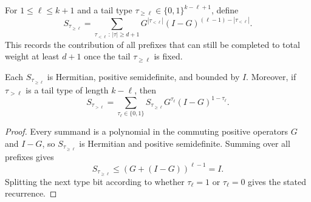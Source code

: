 \begin{definition}\label{def:truncated-type-sums}
	\leanok
	For $1 \le \ell \le k+1$ and a tail type $\tau_{\ge \ell} \in \{0,1\}^{k-\ell+1}$, define
	\[
		S_{\tau_{\ge \ell}}
		=
		\sum_{\tau_{<\ell}\,:\,|\tau|\ge d+1}
		G^{|\tau_{<\ell}|}(I-G)^{(\ell-1)-|\tau_{<\ell}|}.
	\]
	This records the contribution of all prefixes that can still be completed to total weight at least $d+1$ once the tail $\tau_{\ge \ell}$ is fixed.
\end{definition}

\begin{lemma}\label{lem:truncated-type-sum-recurrence}
	\leanok
	Each $S_{\tau_{\ge \ell}}$ is Hermitian, positive semidefinite, and bounded by $I$. Moreover, if $\tau_{>\ell}$ is a tail type of length $k-\ell$, then
	\[
		S_{\tau_{>\ell}}
		=
		\sum_{\tau_\ell \in \{0,1\}} S_{\tau_{\ge \ell}} G^{\tau_\ell}(I-G)^{1-\tau_\ell}.
	\]
\end{lemma}
\begin{proof}
	\leanok
	Every summand is a polynomial in the commuting positive operators $G$ and $I-G$, so $S_{\tau_{\ge \ell}}$ is Hermitian and positive semidefinite. Summing over all prefixes gives
	\[
		S_{\tau_{\ge \ell}} \le (G+(I-G))^{\ell-1}=I.
	\]
	Splitting the next type bit according to whether $\tau_\ell=1$ or $\tau_\ell=0$ gives the stated recurrence.
\end{proof}

